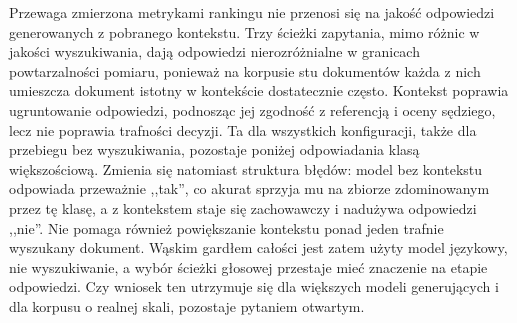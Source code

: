 Przewaga zmierzona metrykami rankingu nie przenosi się na jakość odpowiedzi generowanych
z pobranego kontekstu. Trzy ścieżki zapytania, mimo różnic w jakości wyszukiwania, dają
odpowiedzi nierozróżnialne w granicach powtarzalności pomiaru, ponieważ na korpusie stu
dokumentów każda z nich umieszcza dokument istotny w kontekście dostatecznie często. Kontekst
poprawia ugruntowanie odpowiedzi, podnosząc jej zgodność z referencją i oceny sędziego, lecz
nie poprawia trafności decyzji. Ta dla wszystkich konfiguracji, także dla przebiegu bez
wyszukiwania, pozostaje poniżej odpowiadania klasą większościową. Zmienia się natomiast
struktura błędów: model bez kontekstu odpowiada przeważnie ,,tak'', co akurat sprzyja mu na
zbiorze zdominowanym przez tę klasę, a z kontekstem staje się zachowawczy i nadużywa odpowiedzi
,,nie''. Nie pomaga również powiększanie kontekstu ponad jeden trafnie wyszukany dokument. Wąskim
gardłem całości jest zatem użyty model językowy, nie wyszukiwanie, a wybór ścieżki głosowej
przestaje mieć znaczenie na etapie odpowiedzi. Czy wniosek ten utrzymuje się dla większych modeli
generujących i dla korpusu o realnej skali, pozostaje pytaniem otwartym.
